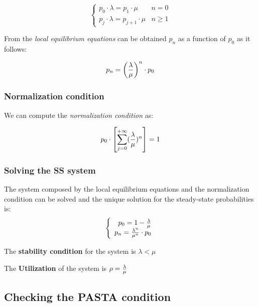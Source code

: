 \documentclass{article}
\begin{document}
            \[
            \left\{
                \begin{array}{rcrc}
                    p_0 \cdot \lambda = p_1 \cdot \mu & n=0 \\
                    p_j \cdot \lambda  = p_{j+1} \cdot \mu & n \ge 1
                \end{array}
            \right.
            \]
        
            From the \textit{local equilibrium equations} can be obtained $p_n$ as a function of $p_0$ as it follows:
            
            \[p_n=\left({\lambda \over \mu}\right)^n \cdot p_0\]
        
        \subsubsection{Normalization condition}
        
            We can compute the \textit{normalization condition} as:
            
            \[
            p_0\cdot \left [\sum_{j=0}^{+\infty}({\lambda \over \mu})^n \right]=1
            \]
        
        \subsubsection{Solving the SS system}
        
            The system composed by the local equilibrium equations and the normalization condition can be solved and the unique solution for the steady-state probabilities is:
                \[
                \left\{
                    \begin{array}{rcrc}
                        p_0 = 1-{\lambda \over \mu} \\
                        p_n={\lambda^n \over \mu^n} \cdot p_0
                    \end{array}
                \right.
                \]
            
            The \textbf{stability condition} for the system is $\lambda < \mu$
            
            The \textbf{Utilization} of the system is $\rho = {\lambda \over \mu}$
    
    \subsection{Checking the PASTA condition}
    
\end{document}
